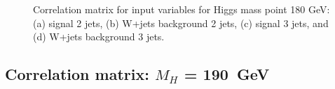 \begin{figure}[bthp!]
{}
\caption{\label{fig:FigCorr180Mu} 
Correlation matrix for input variables for Higgs mass point 180 GeV:
(a) signal 2 jets, (b) W+jets background 2 jets, 
(c) signal 3 jets, and (d) W+jets background 3 jets.
}
\end{figure}
\newpage
\subsection{Correlation matrix: \texorpdfstring{$M_H$}{M(H)} = 190~GeV}
\begin{figure}[bthp!]
\vspace*{1mm} \\
\end{figure}
